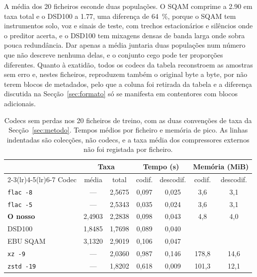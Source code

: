 \documentclass[a4paper,11pt]{article}
\begin{document}
A média dos 20 ficheiros esconde duas populações. O SQAM comprime a \num{2,90}
em taxa total e o DSD100 a \num{1,77}, uma diferença de \SI{64}{\percent},
porque o SQAM tem instrumentos solo, voz e sinais de teste, com trechos
estacionários e silêncios onde o preditor acerta, e o DSD100 tem mixagens densas
de banda larga onde sobra pouca redundância. Dar apenas a média juntaria duas
populações num número que não descreve nenhuma delas, e o conjunto cego pode ter
proporções diferentes. Quanto à exatidão, todos os codecs da tabela reconstroem
as amostras sem erro e, nestes ficheiros, reproduzem também o original byte a
byte, por não terem blocos de metadados, pelo que a coluna foi retirada da
tabela e a diferença discutida na Secção~\ref{sec:formato} só se manifesta em
contentores com blocos adicionais.

\begin{table}[htbp]
\centering
\caption{Codecs sem perdas nos 20 ficheiros de treino, com as duas convenções
de taxa da Secção~\ref{sec:metodo}. Tempos médios por ficheiro e memória de
pico. As linhas indentadas são colecções, não codecs, e a taxa média dos
compressores externos não foi registada por ficheiro.}
\label{tab:lossless}
\footnotesize
\begin{tabular}{l cc cc cc}
\toprule
 & \multicolumn{2}{c}{Taxa} & \multicolumn{2}{c}{Tempo (s)} & \multicolumn{2}{c}{Memória (MiB)} \\
\cmidrule(lr){2-3}\cmidrule(lr){4-5}\cmidrule(lr){6-7}
Codec & média & total & codif. & descodif. & codif. & descodif. \\
\midrule
\texttt{flac -8}  & --- & 2,5675 & 0,097 & 0,025 & 3,6 & 3,1 \\
\texttt{flac -5}  & --- & 2,5343 & 0,035 & 0,024 & 3,6 & 3,1 \\
\textbf{O nosso}  & 2,4903 & 2,2838 & 0,098 & 0,043 & 4,8 & 4,0 \\
\quad DSD100      & 1,8485 & 1,7698 & 0,089 & 0,040 &     &     \\
\quad EBU SQAM    & 3,1320 & 2,9019 & 0,106 & 0,047 &     &     \\
\texttt{xz -9}    & --- & 2,0360 & 0,987 & 0,146 & 178,8 & 14,6 \\
\texttt{zstd -19} & --- & 1,8202 & 0,618 & 0,009 & 101,3 & 12,1 \\
\bottomrule
\end{tabular}
\end{table}
\end{document}
